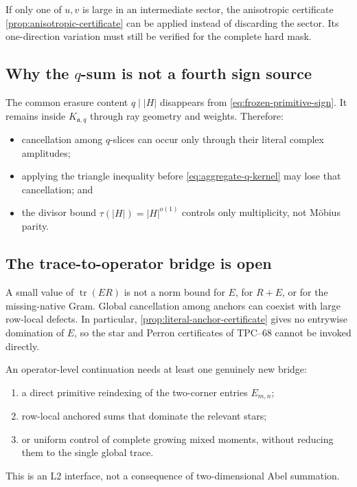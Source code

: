 If only one of \(u,v\) is large in an intermediate sector, the anisotropic
certificate \cref{prop:anisotropic-certificate} can be applied instead of
discarding the sector.  Its one-direction variation must still be verified
for the complete hard mask.

\subsection{Why the \texorpdfstring{\(q\)}{q}-sum is not a fourth sign source}

The common erasure content \(q\mid |H|\) disappears from
\eqref{eq:frozen-primitive-sign}.  It remains inside
\(K_{\mathfrak a,q}\) through ray geometry and weights.  Therefore:
\begin{itemize}
 \item cancellation among \(q\)-slices can occur only through their literal
 complex amplitudes;
 \item applying the triangle inequality before
 \eqref{eq:aggregate-q-kernel} may lose that cancellation; and
 \item the divisor bound \(\tau(|H|)=|H|^{o(1)}\) controls only
 multiplicity, not M\"obius parity.
\end{itemize}

\subsection{The trace-to-operator bridge is open}

A small value of \(\operatorname{tr}(ER)\) is not a norm bound for \(E\),
for \(R+E\), or for the missing-native Gram.  Global cancellation among
anchors can coexist with large row-local defects.  In particular,
\cref{prop:literal-anchor-certificate} gives no entrywise domination of
\(E\), so the star and Perron certificates of TPC--68 cannot be invoked
directly.

An operator-level continuation needs at least one genuinely new bridge:
\begin{enumerate}[label=\textup{(\roman*)}]
 \item a direct primitive reindexing of the two-corner entries \(E_{m,n}\);
 \item row-local anchored sums that dominate the relevant stars;
 \item or uniform control of complete growing mixed moments, without
 reducing them to the single global trace.
\end{enumerate}
This is an L2 interface, not a consequence of two-dimensional Abel
summation.

